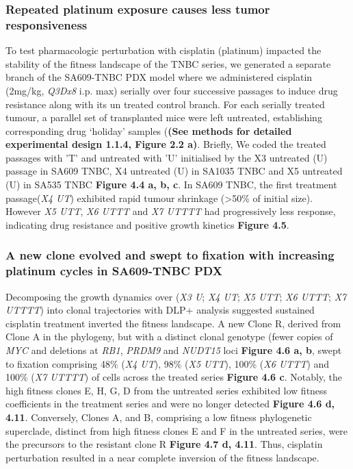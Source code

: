 \subsubsection{Repeated platinum exposure causes less tumor responsiveness} 
 To test pharmacologic perturbation with cisplatin (platinum) impacted the stability of the fitness landscape of the TNBC series, we generated a separate branch of the SA609-TNBC PDX model where we administered cisplatin (2mg/kg, \textit{Q3Dx8} i.p. max) serially over four successive passages to induce drug resistance along with its un treated control branch. For each serially treated tumour, a parallel set of transplanted mice were left untreated, establishing corresponding drug ‘holiday’ samples (\textbf{(See methods for detailed experimental design 1.1.4, Figure 2.2 a)}. Briefly, We coded the treated passages with 'T' and untreated with 'U' initialised by the X3 untreated (U) passage in SA609 TNBC, X4 untreated (U) in SA1035 TNBC and X5 untreated (U) in SA535 TNBC \textbf{Figure 4.4 a, b, c}. In SA609 TNBC, the first treatment passage(\textit{X4 UT}) exhibited rapid tumour shrinkage (>50\% of initial size). However \textit{X5 UTT}, \textit{X6 UTTT} and \textit{X7 UTTTT} had progressively less response, indicating drug resistance and positive growth kinetics \textbf{Figure 4.5}. 


\subsubsection{A new clone evolved and swept to fixation with increasing platinum cycles in SA609-TNBC PDX}
Decomposing the growth dynamics over (\textit{X3 U}; \textit{X4 UT}; \textit{X5 UTT}; \textit{X6 UTTT}; \textit{X7 UTTTT}) into clonal trajectories with DLP+ analysis suggested sustained cisplatin treatment inverted the fitness landscape. A new Clone R,  derived from Clone A in the phylogeny, but with a distinct clonal genotype (fewer copies of \textit{MYC} and deletions at \textit{RB1}, \textit{PRDM9} and \textit{NUDT15} loci \textbf{Figure 4.6 a, b}, swept to fixation comprising 48\% (\textit{X4 UT}), 98\% (\textit{X5 UTT}), 100\% (\textit{X6 UTTT}) and 100\% (\textit{X7 UTTTT}) of cells across the treated series \textbf{Figure 4.6 c}. Notably, the high fitness clones E, H, G, D from the untreated series exhibited low fitness coefficients in the treatment series and were no longer detected \textbf{Figure 4.6 d, 4.11}. Conversely, Clones A, and B, comprising a low fitness phylogenetic superclade, distinct from high fitness clones E and F in the untreated series, were the precursors to the resistant clone R \textbf{Figure 4.7 d, 4.11}. Thus, cisplatin perturbation resulted in a near complete inversion of the fitness landscape.

